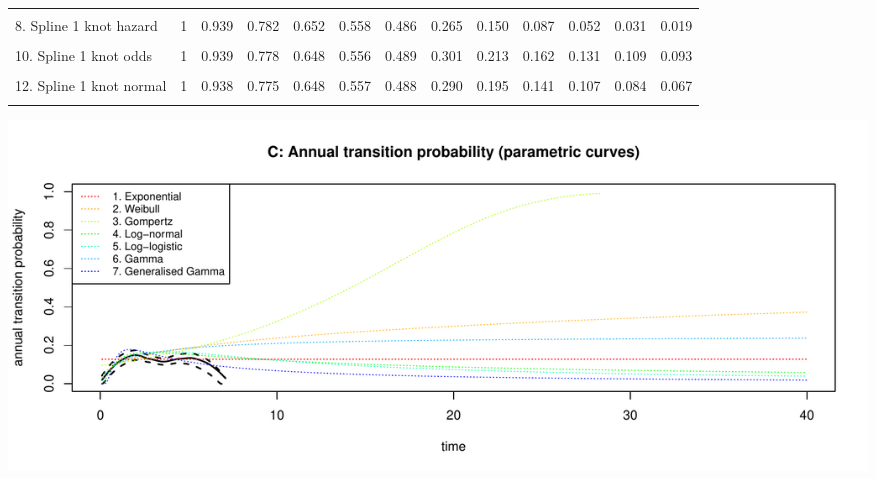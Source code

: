 \documentclass[]{article}
\begin{document}
{\begin{tabular}{lrrrrrrrrrrrr}
\cellcolor{gray!6}{7. Generalised Gamma} & \cellcolor{gray!6}{1} & \cellcolor{gray!6}{0.937} & \cellcolor{gray!6}{0.774} & \cellcolor{gray!6}{0.648} & \cellcolor{gray!6}{0.556} & \cellcolor{gray!6}{0.488} & \cellcolor{gray!6}{0.310} & \cellcolor{gray!6}{0.232} & \cellcolor{gray!6}{0.187} & \cellcolor{gray!6}{0.158} & \cellcolor{gray!6}{0.138} & \cellcolor{gray!6}{0.122}\\
8. Spline 1 knot hazard & 1 & 0.939 & 0.782 & 0.652 & 0.558 & 0.486 & 0.265 & 0.150 & 0.087 & 0.052 & 0.031 & 0.019\\
\cellcolor{gray!6}{9. Spline 2 knots hazard} & \cellcolor{gray!6}{1} & \cellcolor{gray!6}{0.935} & \cellcolor{gray!6}{0.766} & \cellcolor{gray!6}{0.673} & \cellcolor{gray!6}{0.579} & \cellcolor{gray!6}{0.490} & \cellcolor{gray!6}{0.184} & \cellcolor{gray!6}{0.061} & \cellcolor{gray!6}{0.018} & \cellcolor{gray!6}{0.005} & \cellcolor{gray!6}{0.001} & \cellcolor{gray!6}{0.000}\\
10. Spline 1 knot odds & 1 & 0.939 & 0.778 & 0.648 & 0.556 & 0.489 & 0.301 & 0.213 & 0.162 & 0.131 & 0.109 & 0.093\\
\cellcolor{gray!6}{11. Spline 2 knots odds} & \cellcolor{gray!6}{1} & \cellcolor{gray!6}{0.935} & \cellcolor{gray!6}{0.769} & \cellcolor{gray!6}{0.673} & \cellcolor{gray!6}{0.576} & \cellcolor{gray!6}{0.489} & \cellcolor{gray!6}{0.235} & \cellcolor{gray!6}{0.136} & \cellcolor{gray!6}{0.089} & \cellcolor{gray!6}{0.063} & \cellcolor{gray!6}{0.048} & \cellcolor{gray!6}{0.037}\\
12. Spline 1 knot normal & 1 & 0.938 & 0.775 & 0.648 & 0.557 & 0.488 & 0.290 & 0.195 & 0.141 & 0.107 & 0.084 & 0.067\\
\cellcolor{gray!6}{13. Spline 2 knots normal} & \cellcolor{gray!6}{1} & \cellcolor{gray!6}{0.930} & \cellcolor{gray!6}{0.773} & \cellcolor{gray!6}{0.669} & \cellcolor{gray!6}{0.572} & \cellcolor{gray!6}{0.489} & \cellcolor{gray!6}{0.240} & \cellcolor{gray!6}{0.135} & \cellcolor{gray!6}{0.083} & \cellcolor{gray!6}{0.054} & \cellcolor{gray!6}{0.037} & \cellcolor{gray!6}{0.026}\\
\bottomrule
\end{tabular}}

\begin{flushleft}\includegraphics[height=0.29\textheight]{Images/validate_extrapolation2-3} \end{flushleft}
\end{document}
